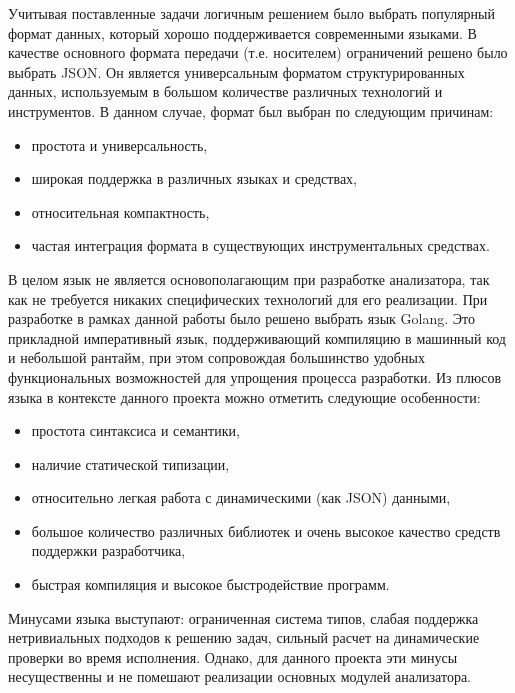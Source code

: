 Учитывая поставленные задачи
логичным решением было выбрать популярный формат данных, который хорошо поддерживается современными
языками. В качестве основного формата передачи (т.е. носителем) ограничений решено было выбрать JSON.
Он является универсальным форматом структурированных данных, используемым в большом количестве
различных технологий и инструментов. В данном случае, формат был выбран по следующим причинам:
\begin{itemize}
    \item простота и универсальность,
    \item широкая поддержка в различных языках и средствах,
    \item относительная компактность,
    \item частая интеграция формата в существующих инструментальных средствах.
\end{itemize}

В целом язык не является основополагающим при разработке анализатора, так как не требуется
никаких специфических технологий для его реализации. При разработке в рамках данной работы
было решено выбрать язык Golang. Это прикладной императивный язык, поддерживающий
компиляцию в машинный код и небольшой рантайм, при этом сопровождая большинство
удобных функциональных возможностей для упрощения процесса разработки.
Из плюсов языка в контексте данного проекта можно отметить следующие особенности:
\begin{itemize}
    \item простота синтаксиса и семантики,
    \item наличие статической типизации,
    \item относительно легкая работа с динамическими (как JSON) данными,
    \item большое количество различных библиотек и очень высокое качество средств поддержки разработчика,
    \item быстрая компиляция и высокое быстродействие программ.
\end{itemize}

Минусами языка выступают: ограниченная система типов, слабая поддержка нетривиальных подходов к решению задач,
сильный расчет на динамические проверки во время исполнения.
Однако, для данного проекта эти минусы несущественны и не помешают реализации
основных модулей анализатора.
\clearpage